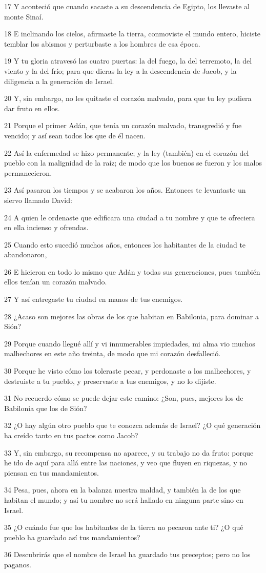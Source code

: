 \par 17 Y aconteció que cuando sacaste a su descendencia de Egipto, los llevaste al monte Sinaí.
\par 18 E inclinando los cielos, afirmaste la tierra, conmoviste el mundo entero, hiciste temblar los abismos y perturbaste a los hombres de esa época.
\par 19 Y tu gloria atravesó las cuatro puertas: la del fuego, la del terremoto, la del viento y la del frío; para que dieras la ley a la descendencia de Jacob, y la diligencia a la generación de Israel.
\par 20 Y, sin embargo, no les quitaste el corazón malvado, para que tu ley pudiera dar fruto en ellos.
\par 21 Porque el primer Adán, que tenía un corazón malvado, transgredió y fue vencido; y así sean todos los que de él nacen.
\par 22 Así la enfermedad se hizo permanente; y la ley (también) en el corazón del pueblo con la malignidad de la raíz; de modo que los buenos se fueron y los malos permanecieron.
\par 23 Así pasaron los tiempos y se acabaron los años. Entonces te levantaste un siervo llamado David:
\par 24 A quien le ordenaste que edificara una ciudad a tu nombre y que te ofreciera en ella incienso y ofrendas.
\par 25 Cuando esto sucedió muchos años, entonces los habitantes de la ciudad te abandonaron,
\par 26 E hicieron en todo lo mismo que Adán y todas sus generaciones, pues también ellos tenían un corazón malvado.
\par 27 Y así entregaste tu ciudad en manos de tus enemigos.
\par 28 ¿Acaso son mejores las obras de los que habitan en Babilonia, para dominar a Sión?
\par 29 Porque cuando llegué allí y vi innumerables impiedades, mi alma vio muchos malhechores en este año treinta, de modo que mi corazón desfalleció.
\par 30 Porque he visto cómo los toleraste pecar, y perdonaste a los malhechores, y destruiste a tu pueblo, y preservaste a tus enemigos, y no lo dijiste.
\par 31 No recuerdo cómo se puede dejar este camino: ¿Son, pues, mejores los de Babilonia que los de Sión?
\par 32 ¿O hay algún otro pueblo que te conozca además de Israel? ¿O qué generación ha creído tanto en tus pactos como Jacob?
\par 33 Y, sin embargo, su recompensa no aparece, y su trabajo no da fruto: porque he ido de aquí para allá entre las naciones, y veo que fluyen en riquezas, y no piensan en tus mandamientos.
\par 34 Pesa, pues, ahora en la balanza nuestra maldad, y también la de los que habitan el mundo; y así tu nombre no será hallado en ninguna parte sino en Israel.
\par 35 ¿O cuándo fue que los habitantes de la tierra no pecaron ante ti? ¿O qué pueblo ha guardado así tus mandamientos?
\par 36 Descubrirás que el nombre de Israel ha guardado tus preceptos; pero no los paganos.

